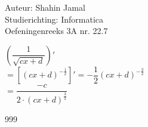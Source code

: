 \documentclass[a4paper]{article}
\begin{document}
  
\noindent \large Auteur: Shahin Jamal \\
\noindent \large Studierichting: Informatica\\
\noindent \large Oefeningenreeks 3A nr. 22.7\\

\medskip

\normalsize

$\left(\dfrac{1}{\sqrt{cx + d}}\right)'$\\

$= \left[(cx + d)^{-\tfrac{1}{2}}\right]' = -\dfrac{1}{2} (cx + d)^{-\tfrac{3}{2}}$\\

$= \dfrac{-c}{2\cdot(cx+d)^{\tfrac{3}{2}}}$\\

\begin{thebibliography}{999}
\end{thebibliography}
\end{document}
